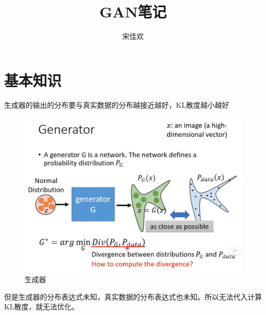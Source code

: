 \documentclass[UTF8]{ctexart} %
\title{GAN笔记}
\author{宋佳欢}
\begin{document}
	\maketitle
	\tableofcontents
	\songti {}
	\section{基本知识}
	
	生成器的输出的分布要与真实数据的分布越接近越好，KL散度越小越好	
	\begin{figure}[H]
	\centering
	\includegraphics[scale=0.5]{screenshot001}
	\caption{生成器}
	\label{fig:screenshot001}
	\end{figure}
	但是生成器的分布表达式未知，真实数据的分布表达式也未知。所以无法代入计算KL散度，就无法优化。
	
\end{document}
